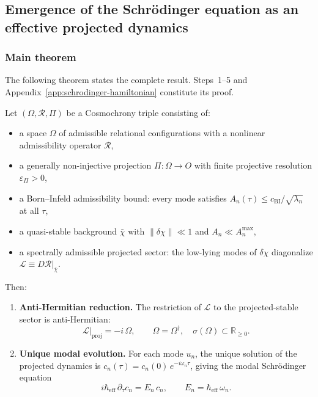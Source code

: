 \subsection{Emergence of the Schr\"{o}dinger equation as an effective projected dynamics}
  \label{app:schrodinger-derivation}

  \subsubsection*{Main theorem}

    The following theorem states the complete result.
    Steps~1--5 and Appendix~\ref{app:schrodinger-hamiltonian} constitute its proof.

    \begin{theorem}
      \label{thm:schrodinger-emergence}
      Let $(\Omega, \mathcal{R}, \Pi)$ be a Cosmochrony triple consisting of:
      \begin{itemize}
        \item[(H1)] a space $\Omega$ of admissible relational configurations with a nonlinear
        admissibility operator $\mathcal{R}$,
        \item[(H2)] a generally non-injective projection $\Pi : \Omega \to O$ with finite
        projective resolution $\varepsilon_\Pi > 0$,
        \item[(H3)] a Born--Infeld admissibility bound: every mode satisfies
        $A_n(\tau) \leq c_{\mathrm{BI}}/\sqrt{\lambda_n}$ at all $\tau$,
        \item[(H4)] a quasi-stable background $\bar{\chi}$ with $\|\delta\chi\| \ll 1$
        and $A_n \ll A_n^{\max}$,
        \item[(H5)] a spectrally admissible projected sector: the low-lying modes of
        $\delta\chi$ diagonalize $\mathcal{L} \equiv D\mathcal{R}|_{\bar\chi}$.
      \end{itemize}
      Then:
      \begin{enumerate}
        \item[(C1)] \textbf{Anti-Hermitian reduction.}
        The restriction of $\mathcal{L}$ to the projected-stable sector is anti-Hermitian:
        \[
          \mathcal{L}\big|_{\mathrm{proj}} = -i\,\Omega,
          \qquad \Omega = \Omega^\dagger,\quad \sigma(\Omega) \subset \mathbb{R}_{\geq 0}.
        \]

        \item[(C2)] \textbf{Unique modal evolution.}
        For each mode $u_n$, the unique solution of the projected dynamics is
        $c_n(\tau) = c_n(0)\,e^{-i\omega_n\tau}$,
        giving the modal Schr\"{o}dinger equation
        \[
          i\hbar_{\mathrm{eff}}\,\partial_\tau c_n = E_n\,c_n,
          \qquad E_n = \hbar_{\mathrm{eff}}\,\omega_n.
        \]


\end{enumerate}
\end{theorem}
